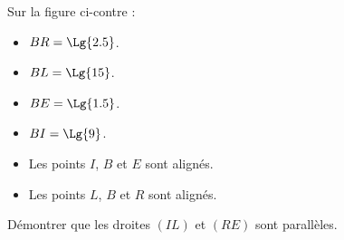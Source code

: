 \begin{exercice*}
    \phantom{rrr}

    \vspace*{-5mm}
    \begin{minipage}{0.65\linewidth}
        Sur la figure ci-contre :
        \begin{itemize}
            \item $BR=\Lg{2.5}$.
            \item $BL=\Lg{15}$.
            \item $BE=\Lg{1.5}$.
            \item $BI=\Lg{9}$.
            \item Les points $I$, $B$ et $E$ sont alignés.
            \item Les points $L$, $B$ et $R$ sont alignés.            
        \end{itemize}
    \end{minipage}
    \begin{minipage}{0.35\linewidth}        
    \end{minipage}

    Démontrer que les droites $(IL)$ et $(RE)$ sont parallèles.

\end{exercice*}
\begin{corrige}
    \phantom{rrr}

\end{corrige}

